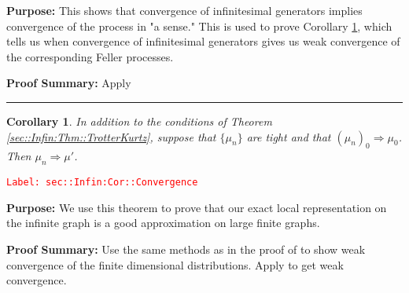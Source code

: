 \documentclass[12pt]{article}
\newcommand{\tr}{\textcolor{red}}
\newcommand{\labe}[1]{\tr{\texttt{Label: #1}}}
\newcommand{\purpose}{\textbf{Purpose: }}
\newcommand{\pfsum}{\textbf{Proof Summary: }}
\newcommand{\lin}{\rule{\linewidth}{0.4 pt}}
\newtheorem{coro}[thms]{Corollary}
\begin{document}
\purpose This shows that convergence of infinitesimal generators implies convergence of the process in "a sense." This is used to prove Corollary \ref{sec::Infin:Cor::Convergence}, which tells us when convergence of infinitesimal generators gives us weak convergence of the corresponding Feller processes.

\pfsum Apply \cite[Theorem 2.12]{Lig85}

\lin

\begin{coro}
In addition to the conditions of Theorem \ref{sec::Infin:Thm::TrotterKurtz}, suppose that \(\{\mu_n\}\) are tight and that \((\mu_n)_0 \Rightarrow \mu_0\). Then \(\mu_n \Rightarrow \mu'\).
\label{sec::Infin:Cor::Convergence}
\end{coro}
\labe{sec::Infin:Cor::Convergence}

\purpose We use this theorem to prove that our exact local representation on the infinite graph is a good approximation on large finite graphs.

\pfsum Use the same methods as in the proof of \cite[Theorem 4.2]{Kur81} to show weak convergence of the finite dimensional distributions. Apply \cite[Theorem 13.1]{Bil99} to get weak convergence.
\end{document}
